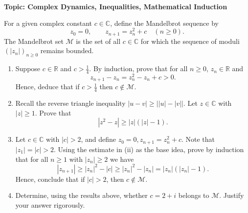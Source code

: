 \begin{problem}
\noindent \textbf{Topic: Complex Dynamics, Inequalities, Mathematical Induction}

\medskip

For a given complex constant $c \in \mathbb{C}$, define the Mandelbrot sequence by
\[
z_0 = 0, \qquad z_{n+1} = z_n^2 + c \quad (n \ge 0).
\]
The Mandelbrot set $\mathcal{M}$ is the set of all $c \in \mathbb{C}$ for which the sequence of moduli $(|z_n|)_{n\ge 0}$ remains bounded.

\begin{enumerate}
    \item[(i)] Suppose $c \in \mathbb{R}$ and $c > \frac{1}{4}$. By induction, prove that for all $n \ge 0$, $z_n \in \mathbb{R}$ and
    \[
    z_{n+1} - z_n = z_n^2 - z_n + c > 0.
    \]
    Hence, deduce that if $c > \frac{1}{4}$ then $c \notin \mathcal{M}$.

    \item[(ii)] Recall the reverse triangle inequality $|u - v| \ge \big| |u| - |v| \big|$. Let $z \in \mathbb{C}$ with $|z| \ge 1$. Prove that
    \[
    |z^2 - z| \ge |z|(|z| - 1).
    \]

    \item[(iii)] Let $c \in \mathbb{C}$ with $|c| > 2$, and define $z_0 = 0, z_{n+1} = z_n^2 + c$. Note that $|z_1| = |c| > 2$. Using the estimate in (ii) as the base idea, prove by induction that for all $n \ge 1$ with $|z_n| \ge 2$ we have
    \[
    |z_{n+1}| \ge |z_n|^2 - |c| \ge |z_n|^2 - |z_n| = |z_n|(|z_n| - 1).
    \]
    Hence, conclude that if $|c| > 2$, then $c \notin \mathcal{M}$.

    \item[(iv)] Determine, using the results above, whether $c = 2 + i$ belongs to $\mathcal{M}$. Justify your answer rigorously.
\end{enumerate}

\begin{center}
\end{center}
\end{problem}

